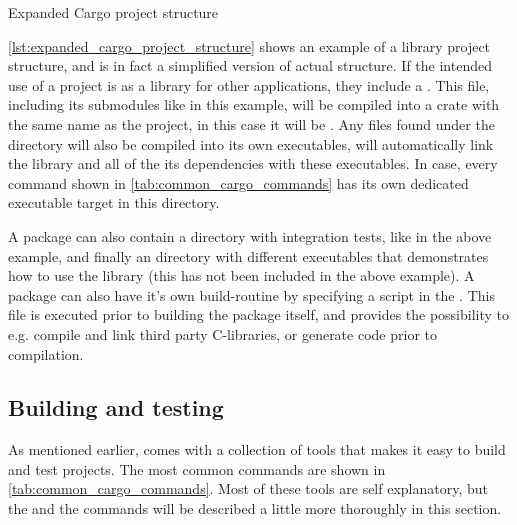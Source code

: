 \begin{listing}
\caption{Expanded Cargo project structure}
\label{lst:expanded_cargo_project_structure}
\end{listing}

\autoref{lst:expanded_cargo_project_structure} shows an example of a library project structure, and is in fact a simplified version of {\cargos} actual structure.
If the intended use of a project is as a library for other applications, they include a .
This file, including its submodules like  in this example, will be compiled into a {\rust} crate with the same name as the project, in this case it will be .
Any files found under the  directory will also be compiled into its own executables, {\cargo} will automatically link the library and all of the its dependencies with these executables.
In {\cargos} case, every command shown in \autoref{tab:common_cargo_commands} has its own dedicated executable target in this directory.

A package can also contain a  directory with integration tests, like in the above example, and finally an  directory with different executables that demonstrates how to use the library (this has not been included in the above example).
A package can also have it's own build-routine by specifying a  script in the .
This file is executed prior to building the package itself, and provides the possibility to e.g. compile and link third party C-libraries, or generate code prior to compilation.

\subsection{Building and testing}

As mentioned earlier, {\cargo} comes with a collection of tools that makes it easy to build and test {\rust} projects.
The most common commands are shown in \autoref{tab:common_cargo_commands}.
Most of these tools are self explanatory, but the  and the  commands will be described a little more thoroughly in this section.

